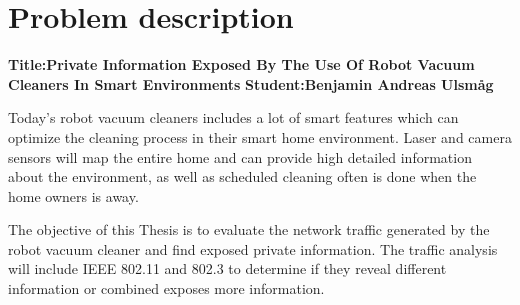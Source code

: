\chapter*{Problem description}


\textbf{Title:Private Information Exposed By The Use Of Robot Vacuum Cleaners In Smart Environments}
\newline
\textbf{Student:Benjamin Andreas Ulsmåg}
\newline
\newline

Today's robot vacuum cleaners includes a lot of smart features which can optimize the cleaning process in their smart home environment. Laser and camera sensors will map the entire home and can provide high detailed information about the environment, as well as scheduled cleaning often is done when the home owners is away.

The objective of this Thesis is to evaluate the network traffic generated by the robot vacuum cleaner and find exposed private information. The traffic analysis will include IEEE 802.11 and 802.3 to determine if they reveal different information or combined exposes more information.



